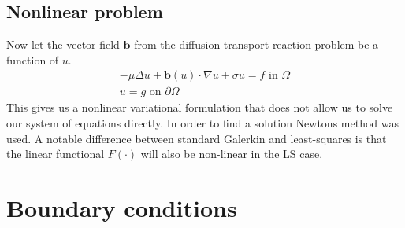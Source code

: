 \subsection{Nonlinear problem}
Now let the vector field $\mathbf{b}$ from the diffusion transport reaction problem be a function of $u$. 
\begin{align}
	-\mu \Delta u + \mathbf{b}(u) \cdot \nabla u +\sigma u = f \text{ in } \Omega \\
	u = g \text{ on } \partial \Omega
	\label{eq:DiffTransNonLin}
\end{align}
This gives us a nonlinear variational formulation that does not allow us to solve our system of equations directly. In order to find a solution Newtons method was used. A notable difference between standard Galerkin and least-squares is that the linear functional $F(\cdot)$ will also be non-linear in the LS case.
\section{Boundary conditions}
